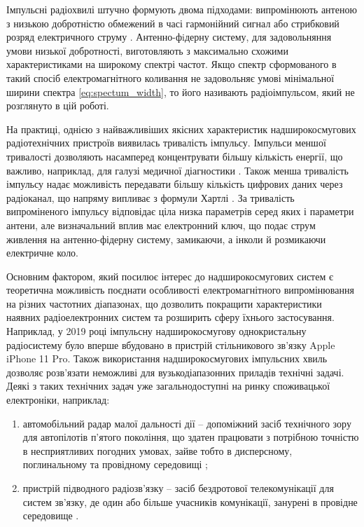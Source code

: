 Імпульсні радіохвилі штучно формують двома підходами: випромінюють антеною 
з низькою добротністю обмежений в часі гармонійний сигнал 
\cite{imp:Mesyas1963, imp:Mesyas1974} або стрибковий розряд електричного 
струму \cite{imp:BaumMN053}.  Антенно-фiдерну систему, для задовольняння 
умови низької добротності, виготовляють з максимально схожими 
характеристиками на широкому спектрі частот. Якщо спектр сформованого в 
такий спосіб електромагнітного коливання не задовольняє умові 
мінімальної ширини спектра \eqref{eq:spectum_width}, то його називають 
радіоімпульсом, який не розглянуто в цій роботі.

На практиці, однією з найважливіших якісних характеристик надширокосмугових
радіотехнічних пристроїв виявилась тривалість імпульсу. Імпульси меншої 
тривалості дозволяють насамперед концентрувати більшу кількість енергії,
що важливо, наприклад, для галузі медичної діагностики 
\cite{imp:Guardiola2010}. Також менша тривалість імпульсу надає 
можливість передавати більшу кількість цифрових даних через радіоканал, що 
напряму випливає з формули Хартлі \cite{imp:Taub1986}. За тривалість 
випроміненого імпульсу відповідає ціла низка параметрів серед яких і 
параметри антени, але визначальний вплив має електронний ключ, що подає 
струм живлення на антенно-фідерну систему, замикаючи, а інколи й розмикаючи 
електричне коло.


Основним фактором, який посилює інтерес до надширокосмугових систем є 
теоретична можливість поєднати особливості електромагнітного випромінювання 
на різних частотних діапазонах, що дозволить покращити характеристики 
наявних радіоелектронних систем та розширить сферу їхнього застосування.
Наприклад, у 2019 році імпульсну надширокосмугову однокристальну 
радіосистему було вперше вбудовано в пристрій стільникового зв'язку 
Apple iPhone 11 Pro. Також використання надширокосмугових імпульсних 
хвиль дозволяє розв'язати неможливі для вузькодіапазонних приладів 
технічні задачі. Деякі з таких технічних задач уже загальнодоступні на
ринку споживацької електроніки, наприклад:

\begin{enumerate}

\item автомобільний радар малої дальності дії -- допоміжний засіб 
технічного зору для автопілотів п'ятого покоління, що здатен працювати 
з потрібною точністю в несприятливих погодних умовах, зайве тобто в 
дисперсному, поглинальному та провідному середовищі \cite{imp:Yarovoy2017};

\item пристрій підводного радіозв'язку -- засіб бездротової 
телекомунікації для систем зв'язку, де один або більше учасників 
комунікації, занурені в провідне середовище \cite{imp:Garcia2009, 
imp:Karagianni2015}.

\end{enumerate}

